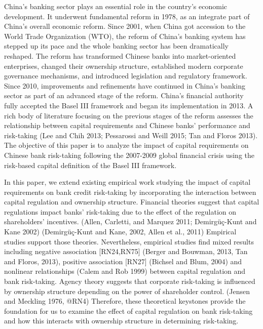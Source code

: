 \documentclass{article}
\begin{document}
China's banking sector plays an essential role in the country's economic
development. It underwent fundamental reform in 1978, as an integrate
part of China's overall economic reform. Since 2001, when China got
accession to the World Trade Organization (WTO), the reform of China's
banking system has stepped up its pace and the whole banking sector has
been dramatically reshaped. The reform has transformed Chinese banks
into market-oriented enterprises, changed their ownership structure,
established modern corporate governance mechanisms, and introduced
legislation and regulatory framework. Since 2010, improvements and
refinements have continued in China's banking sector as part of an
advanced stage of the reform. China's financial authority fully accepted
the Basel III framework and began its implementation in 2013. A rich
body of literature focusing on the previous stages of the reform
assesses the relationship between capital requirements and Chinese
banks' performance and risk-taking (Lee and Chih 2013; Pessarossi and
Weill 2015; Tan and Floros 2013). The objective of this paper is to
analyze the impact of capital requirements on Chinese bank risk-taking
following the 2007-2009 global financial crisis using the risk-based
capital definition of the Basel III framework.

In this paper, we extend existing empirical work studying the impact of
capital requirements on bank credit risk-taking by incorporating the
interaction between capital regulation and ownership structure.
Financial theories suggest that capital regulations impact banks'
risk-taking due to the effect of the regulation on shareholders'
incentives. (Allen, Carletti, and Marquez 2011; Demirgüç-Kunt and Kane
2002) (Demirgüç-Kunt and Kane, 2002, Allen et al., 2011) Empirical
studies support those theories. Nevertheless, empirical studies find
mixed results including negative association {[}RN24,RN75{]} (Berger and
Bouwman, 2013, Tan and Floros, 2013), positive association {[}RN27{]}
(Bichsel and Blum, 2004) and nonlinear relationships (Calem and Rob
1999) between capital regulation and bank risk-taking. Agency theory
suggests that corporate risk-taking is influenced by ownership structure
depending on the power of shareholder control. (Jensen and Meckling
1976, @RN4) Therefore, these theoretical keystones provide the
foundation for us to examine the effect of capital regulation on bank
risk-taking and how this interacts with ownership structure in
determining risk-taking.
\end{document}
